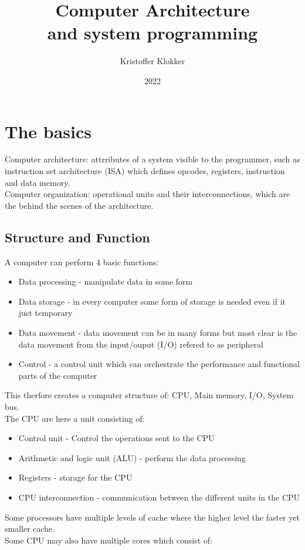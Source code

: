 \documentclass[12pt, a4paper]{article}
\title{Computer Architecture\\and system programming}
\date{2022}
\author{Kristoffer Klokker}
\begin{document}
	\maketitle
	\clearpage
	\tableofcontents
	\clearpage
	\section{The basics}
		Computer architecture: attrributes of a system visible to the programmer, such as instruction set architecture (ISA) which defines opcodes, registers, instruction and data memory.\\
		Computer organization: operational units and their interconnections, which are the behind the scenes of the architecture.\\
		\subsection{Structure and Function}
			A computer can perform 4 basic functions:
			\begin{itemize}
				\item Data processing - manipulate data in some form
				\item Data storage - in every computer some form of storage is needed even if it just temporary
				\item Data movement - data movement can be in many forms but most clear is the data movement from the input/ouput (I/O) refered to as peripheral
				\item Control - a control unit which can orchestrate the performance and functional parts of the computer
			\end{itemize}
			 This therfore creates a computer structure of:  CPU, Main memory, I/O, System bus.\\
			 The CPU are here a unit consisting of:
			 \begin{itemize}
			 	\item Control unit - Control the operations sent to the CPU
			 	\item Arithmetic and logic unit (ALU) - perform the data processing
			 	\item Registers - storage for the CPU
			 	\item CPU interconnection - communication between the different units in the CPU
			\end{itemize}
			Some processors have multiple levels of cache where the higher level the faster yet smaller cache.\\
			Some CPU may also have multiple cores which consist of: 
\end{document}
